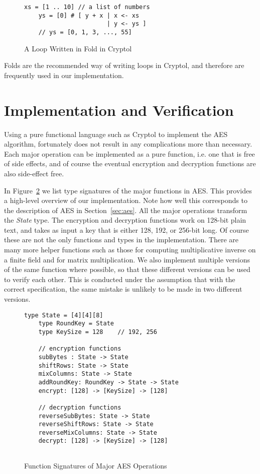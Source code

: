 \documentclass[a4paper, notitlepage]{report}
\begin{document}
\begin{figure}
  \begin{lstlisting}[frame=single]
    xs = [1 .. 10] // a list of numbers
    ys = [0] # [ y + x | x <- xs 
                       | y <- ys ]
    // ys = [0, 1, 3, ..., 55]
  \end{lstlisting}
  \caption{A Loop Written in Fold in Cryptol}
  \label{fig:fold}
\end{figure}

Folds are the recommended way of writing loops in Cryptol, and therefore are
frequently used in our implementation.


\section{Implementation and Verification}
\label{sec:correct}

Using a pure functional language such as Cryptol to implement the AES algorithm,
fortunately does not result in any complications more than necessary. Each major
operation can be implemented as a pure function, i.e. one that is free of side
effects, and of course the eventual encryption and decryption functions are also
side-effect free.

In Figure~\ref{fig:functions} we list type signatures of the major functions
in AES. This provides a high-level overview of our implementation. Note how
well this corresponds to the description of AES in Section~\ref{sec:aes}.
All the major operations transform the \emph{State} type. The encryption and decryption
functions work on 128-bit plain text, and takes as input a key that is either
128, 192, or 256-bit long. Of course these are not the only functions and types in
the implementation. There are many more helper functions such as those for computing
multiplicative inverse on a finite field and for matrix multiplication.
We also implement multiple versions of the same function where possible, so that
these different versions can be used to verify each other. This is conducted
under the assumption that with the correct specification, the same mistake is
unlikely to be made in two different versions.

\begin{figure}
  \begin{lstlisting}[frame=single]
    type State = [4][4][8]
    type RoundKey = State
    type KeySize = 128    // 192, 256

    // encryption functions
    subBytes : State -> State
    shiftRows: State -> State
    mixColumns: State -> State
    addRoundKey: RoundKey -> State -> State
    encrypt: [128] -> [KeySize] -> [128]

    // decryption functions
    reverseSubBytes: State -> State
    reverseShiftRows: State -> State
    reverseMixColumns: State -> State
    decrypt: [128] -> [KeySize] -> [128]
    
  \end{lstlisting}
  \caption{Function Signatures of Major AES Operations}
  \label{fig:functions}
\end{figure}
\end{document}
